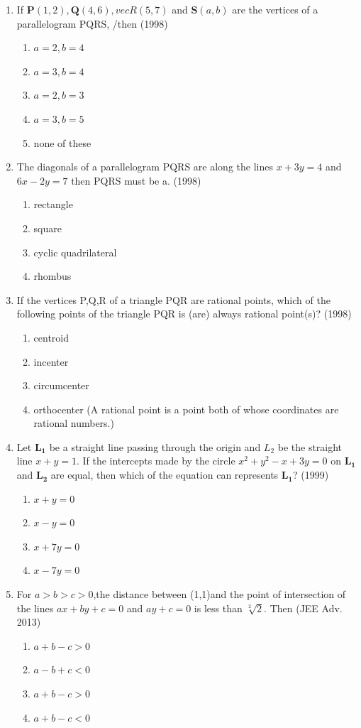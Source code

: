 \documentclass[12pt]{article}
\let\vec\mathbf
\begin{document}
\begin{enumerate}
\item  If $\vec{P}(1,2),\vec{Q}(4,6),vec{R}(5,7)$ and $\vec{S}(a,b)$ are the vertices of a parallelogram PQRS, /then (1998)\\
\begin{enumerate}
\item $a=2,b=4$
\item $a=3,b=4$ 
\item $a=2,b=3$
\item $a=3,b=5$
\item none of these
\end{enumerate}
\item The diagonals of a parallelogram PQRS are along the lines $x+3y=4$ and $6x-2y=7$ then PQRS must be a. (1998)\\
\begin{enumerate}
\item rectangle
\item square
\item cyclic quadrilateral
\item rhombus
\end{enumerate}
\item If the vertices P,Q,R of a triangle PQR are rational points, which of the following points of the triangle PQR is (are) always rational point(s)? (1998)\\
\begin{enumerate}
\item centroid 
\item incenter
\item circumcenter 
\item orthocenter
(A rational point is a point both of whose coordinates are rational numbers.)
\end{enumerate}
\item  Let $\vec{L_1}$ be a straight line passing through the origin and $L_2$ be the straight line $x+y=1$. If the intercepts made by the circle $x^2+y^2-x+3y=0$ on $\vec{L_1}$ and $\vec{L_2}$ are equal, then which of the equation can represents $\vec{L_1}$? (1999)\\
\begin{enumerate}
\item $x+y=0$   
\item $x-y=0$ 
\item $x+7y=0$  
\item $x-7y=0$
\end{enumerate}
\item For $a>b>c>0$,the distance between (1,1)and the point of intersection of the lines $ax+by+c=0$ and $ay+c=0$ is less than $\sqrt[2]{2}$. Then (JEE Adv. 2013)\\
\begin{enumerate}
\item $a+b-c>0$ 
\item $a-b+c<0$
\item $a+b-c>0$
\item $a+b-c<0$
\end{enumerate}

\end{enumerate}
\end{document}
